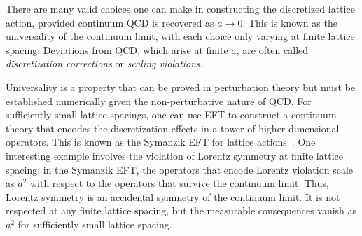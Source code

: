 \documentclass{ar-1col}
\begin{document}
There are many valid choices one can make in constructing the discretized lattice action, provided continuum QCD is recovered as $a\rightarrow0$.
This is known as the universality of the continuum limit, with each choice only varying at finite lattice spacing.
Deviations from QCD, which arise at finite $a$, are often called \textit{discretization corrections} or \textit{scaling violations}.%
\begin{marginnote}
\end{marginnote}%
Universality is a property that can be proved in perturbation theory but must be established numerically given the non-perturbative nature of QCD.  For sufficiently small lattice spacings, one can use EFT to construct a continuum theory that encodes the discretization effects in a tower of higher dimensional operators. This is known as the Symanzik EFT for lattice actions~\cite{Symanzik:1983dc,Symanzik:1983gh}.
One interesting example involves the violation of Lorentz symmetry at finite lattice spacing: in the Symanzik EFT, the operators that encode Lorentz violation scale as $a^2$ with respect to the operators that survive the continuum limit. Thus, Lorentz symmetry is an accidental symmetry of the continuum limit.  It is not respected at any finite lattice spacing, but the measurable consequences vanish as $a^2$ for sufficiently small lattice spacing.
\end{document}

